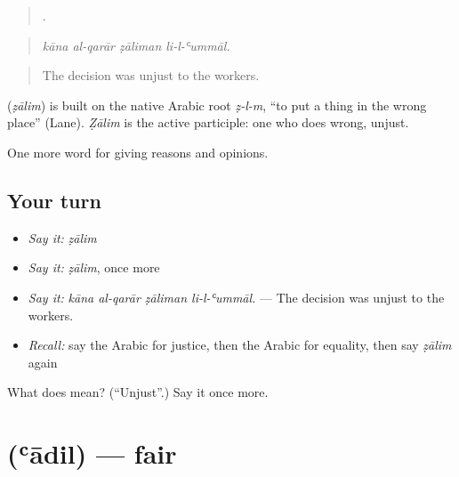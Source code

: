 \begin{quote}
   .
\end{quote}

\begin{quote}
\emph{kāna al-qarār ẓāliman li-l-ʿummāl.}
\end{quote}

\begin{quote}
The decision was unjust to the workers.
\end{quote}

\begin{cousinweb}
\textbf{} (\emph{ẓālim}) is built on the native Arabic root \emph{ẓ-l-m}, \textquotedblleft{}to put a thing in the wrong place\textquotedblright{} (Lane). \emph{Ẓālim} is the active participle: one who does wrong, unjust.
\end{cousinweb}

\begin{grammarlens}[title={What you've built}]
One more word for giving reasons and opinions.
\end{grammarlens}

\subsection*{Your turn}
\begin{itemize}
\raggedright
  \item \emph{Say it:} \emph{ẓālim}
  \item \emph{Say it:} \emph{ẓālim}, once more
  \item \emph{Say it:} \emph{kāna al-qarār ẓāliman li-l-ʿummāl.} — The decision was unjust to the workers.
  \item \emph{Recall:} say the Arabic for justice, then the Arabic for equality, then say \emph{ẓālim} again
\end{itemize}

\begin{tcolorbox}[breakable,colback=teal!4,colframe=teal!35!black,title={Before you move on}]
What does  mean? (\textquotedblleft{}Unjust\textquotedblright{}.) Say it once more.
\end{tcolorbox}
\section[\texorpdfstring{\ar{عادل} (ʿādil)}{عادل (ʿādil)}]{ (ʿādil) — fair}

\label{lesson:AR-C380-adil}



